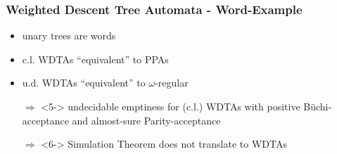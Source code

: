 \documentclass{beamer}
\begin{document}
  \begin{frame}
    \frametitle{Weighted Descent Tree Automata - Word-Example}
    \begin{itemize}
      \item<2-> unary trees are words
      \item<3-> c.l. \acp{WDTA} \enquote{equivalent} to \acp{PPA}
      \item<4-> u.d. \acp{WDTA} \enquote{equivalent} to $\omega$-regular
      \item[$\Rightarrow$]<5-> undecidable emptiness for (c.l.) \acp{WDTA}
        with positive Büchi-acceptance and almost-sure Parity-acceptance
      \item[$\Rightarrow$]<6-> Simulation Theorem does not translate to \acp{WDTA}
    \end{itemize}
  \end{frame}
\end{document}
